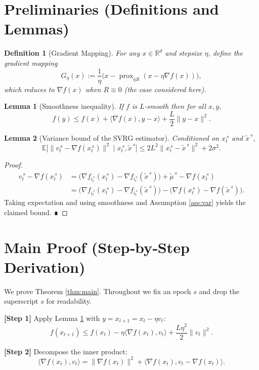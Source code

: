 \documentclass{article}
\newtheorem{lemma}{Lemma}
\newtheorem{definition}{Definition}
\newcommand{\E}{\mathbb{E}}
\newcommand{\R}{\mathbb{R}}
\begin{document}
\section*{Preliminaries (Definitions and Lemmas)}
\begin{definition}[Gradient Mapping]
For any $x\in\R^{d}$ and stepsize $\eta$, define the gradient mapping
\[
G_{\eta}(x):=\frac{1}{\eta}\bigl(x-\operatorname{prox}_{\eta R}(x-\eta\nabla f(x))\bigr),
\]
which reduces to $\nabla f(x)$ when $R\equiv0$ (the case considered here).
\end{definition}
\begin{lemma}[Smoothness inequality]\label{lem:smooth}
If $f$ is $L$‑smooth then for all $x,y$,
\[
f(y)\le f(x)+\langle\nabla f(x),y-x\rangle+\frac{L}{2}\|y-x\|^{2}.
\]
\end{lemma}
\begin{lemma}[Variance bound of the SVRG estimator]\label{lem:var}
Conditioned on $x_t^{\,s}$ and $\tilde{x}^{\,s}$,
\[
\E\!\bigl[\|v_t^{\,s}-\nabla f(x_t^{\,s})\|^{2}\mid x_t^{\,s},\tilde{x}^{\,s}\bigr]
\le 2L^{2}\|x_t^{\,s}-\tilde{x}^{\,s}\|^{2}+2\sigma^{2}.
\]
\end{lemma}
\begin{proof}
\[
\begin{aligned}
v_t^{\,s}-\nabla f(x_t^{\,s})
&=\bigl(\nabla f_{i_t^{\,s}}(x_t^{\,s})-\nabla f_{i_t^{\,s}}(\tilde{x}^{\,s})\bigr)
      +\tilde{\mu}^{\,s}-\nabla f(x_t^{\,s})\\
&=\bigl(\nabla f_{i_t^{\,s}}(x_t^{\,s})-\nabla f_{i_t^{\,s}}(\tilde{x}^{\,s})\bigr)
      -\bigl(\nabla f(x_t^{\,s})-\nabla f(\tilde{x}^{\,s})\bigr).
\end{aligned}
\]
Taking expectation and using smoothness and Assumption \ref{ass:var} yields the claimed bound. ∎
\end{proof}

\section*{Main Proof (Step‑by‑Step Derivation)}
We prove Theorem \ref{thm:main}.  Throughout we fix an epoch $s$ and drop the superscript $s$ for readability.

\noindent\textbf{[Step 1]} Apply Lemma \ref{lem:smooth} with $y=x_{t+1}=x_t-\eta v_t$:
\[
f(x_{t+1})\le f(x_t)-\eta\langle\nabla f(x_t),v_t\rangle+\frac{L\eta^{2}}{2}\|v_t\|^{2}.
\tag{1}
\]

\noindent\textbf{[Step 2]} Decompose the inner product:
\[
\langle\nabla f(x_t),v_t\rangle
=\|\nabla f(x_t)\|^{2}
+\langle\nabla f(x_t),v_t-\nabla f(x_t)\rangle.
\tag{2}
\]
\end{document}
